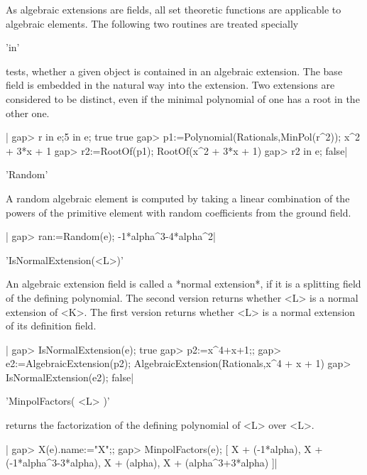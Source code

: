 As algebraic extensions are fields, all set theoretic functions are
applicable to algebraic elements.  The following two routines are treated
specially\:

\vspace{5mm}
'in'

tests,  whether a given object is  contained in an algebraic extension. The
base  field  is  embedded  in  the  natural  way  into  the  extension. Two
extensions are considered to be distinct, even if the minimal polynomial of
one has a root in the other one.

|    gap> r in e;5 in e;
    true
    true
    gap> p1:=Polynomial(Rationals,MinPol(r^2));
    x^2 + 3*x + 1
    gap> r2:=RootOf(p1);
    RootOf(x^2 + 3*x + 1)
    gap> r2 in e;
    false|

\vspace{5mm}
'Random'

A random algebraic element is computed by taking a linear combination of the
powers of the primitive element with random coefficients from the ground
field.

|    gap> ran:=Random(e);
    -1*alpha^3-4*alpha^2|


'IsNormalExtension(<L>)'

An algebraic extension field is called a *normal extension*, if it is a
splitting field of the defining polynomial.  The second version returns
whether <L> is a normal extension of <K>.  The first version returns
whether <L> is a normal extension of its definition field.

|    gap> IsNormalExtension(e);
    true
    gap> p2:=x^4+x+1;;
    gap> e2:=AlgebraicExtension(p2);
    AlgebraicExtension(Rationals,x^4 + x + 1)
    gap> IsNormalExtension(e2);
    false|


'MinpolFactors( <L> )'

returns the factorization of the defining polynomial of <L> over <L>.

|    gap> X(e).name:="X";;
    gap> MinpolFactors(e);
    [ X + (-1*alpha), X + (-1*alpha^3-3*alpha), X + (alpha), 
      X + (alpha^3+3*alpha) ]|



